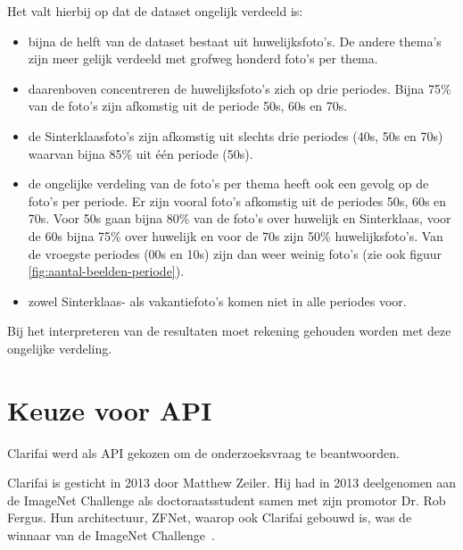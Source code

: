 Het valt hierbij op dat de dataset ongelijk verdeeld is:
\begin{itemize}
	\item bijna de helft van de dataset bestaat uit huwelijksfoto’s. De andere thema’s zijn meer gelijk verdeeld met grofweg honderd foto’s per thema. 
	\item daarenboven concentreren de huwelijksfoto’s zich op drie periodes. Bijna 75\% van de foto’s zijn afkomstig uit de periode 50s, 60s en 70s. 
	\item de Sinterklaasfoto’s zijn afkomstig uit slechts drie periodes (40s, 50s en 70s) waarvan bijna 85\% uit één periode (50s).
	\item de ongelijke verdeling van de foto’s per thema heeft ook een gevolg op de foto’s per periode. Er zijn vooral foto’s afkomstig uit de periodes 50s, 60s en 70s. Voor 50s gaan bijna 80\% van de foto’s over huwelijk en Sinterklaas, voor de 60s bijna 75\% over huwelijk en voor de 70s zijn 50\% huwelijksfoto’s. Van de vroegste periodes (00s en 10s) zijn dan weer weinig foto’s (zie ook figuur \ref{fig:aantal-beelden-periode}).
	\item zowel Sinterklaas- als vakantiefoto’s komen niet in alle periodes voor.
\end{itemize}

Bij het interpreteren van de resultaten moet rekening gehouden worden met deze ongelijke verdeling.

\section{Keuze voor API}
\label{sec:keuze-voor-api}

Clarifai werd als API gekozen om de onderzoeksvraag te beantwoorden. 

Clarifai is gesticht in 2013 door Matthew Zeiler. Hij had in 2013 deelgenomen aan de ImageNet Challenge als doctoraatsstudent samen met zijn promotor Dr. Rob Fergus. Hun architectuur, ZFNet, waarop ook Clarifai gebouwd is, was de winnaar van de ImageNet Challenge~\autocite{Tsang2018}.

